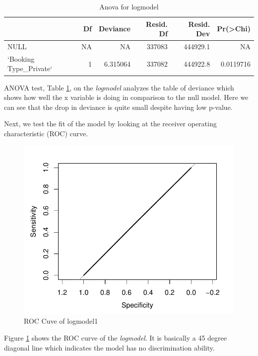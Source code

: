 \documentclass[11pt,a4paper,]{article}
\begin{document}
\begin{table}

\caption{\label{tab:anova}Anova for logmodel}
\centering
\begin{tabular}[t]{lrrrrr}
\toprule
  & Df & Deviance & Resid. Df & Resid. Dev & Pr(>Chi)\\
\midrule
NULL & NA & NA & 337083 & 444929.1 & NA\\
`Booking Type\_Private` & 1 & 6.315064 & 337082 & 444922.8 & 0.0119716\\
\bottomrule
\end{tabular}
\end{table}

ANOVA test, Table \ref{tab:anova}, on the \emph{logmodel} analyzes the table of deviance which shows how well the x variable is doing in comparison to the null model. Here we can see that the drop in deviance is quite small despite having low p-value.

Next, we test the fit of the model by looking at the receiver operating characteristic (ROC) curve.

\begin{figure}

{\centering \includegraphics{Assignment4_files/figure-latex/roc-1} 

}

\caption{ROC Cuve of logmodel1}\label{fig:roc}
\end{figure}

Figure \ref{fig:roc} shows the ROC curve of the \emph{logmodel}. It is basically a 45 degree diagonal line which indicates the model has no discrimination ability.
\end{document}
